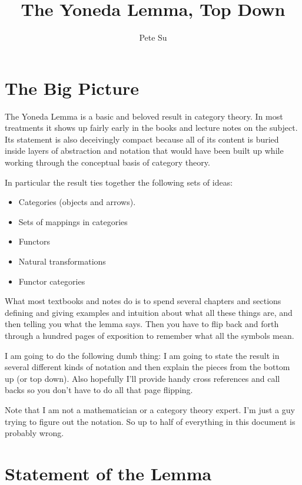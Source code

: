 \documentclass[12pt]{article}
\theoremstyle{definition}
\theoremstyle{remark}
\numberwithin{equation}{section}
\begin{document}
\title{The Yoneda Lemma, Top Down}
\author{Pete Su}

\maketitle
\newpage

\section{The Big Picture}

The Yoneda Lemma is a basic and beloved result in category theory. In most treatments it
shows up fairly early in the books and lecture notes on the subject. Its
statement is also deceivingly compact because all of its content is buried inside layers
of abstraction and notation that would have been built up while working through the
conceptual basis of category theory.

In particular the result ties together the following sets of ideas:

\begin{itemize}

\item Categories (objects and arrows).
\item Sets of mappings in categories
\item Functors
\item Natural transformations
\item Functor categories

\end{itemize}

\noindent
What most textbooks and notes do is to spend several chapters and sections defining and
giving examples and intuition about what all these things are, and then telling you what
the lemma says. Then you have to flip back and forth through a hundred pages of exposition
to remember what all the symbols mean.

I am going to do the following dumb thing: I am going to state the result in several
different kinds of notation and then explain the pieces from the bottom up (or top down).
Also hopefully I'll provide handy cross references and call backs so you don't have to do
all that page flipping.

Note that I am not a mathematician or a category theory expert. I'm just a guy trying to
figure out the notation. So up to half of everything in this document is probably wrong.

\section{Statement of the Lemma}
\end{document}
